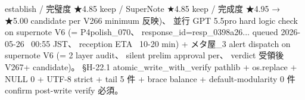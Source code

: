 establish / 完璧度 ★4.85 keep / SuperNote ★4.85 keep / 完成度 ★4.95 → ★5.00 candidate per V266 minimum 反映)、 並行 GPT 5.5pro hard logic check on supernote V6 (= P4polish_070、 response_id=resp_0398a26... queued 2026-05-26 ~00:55 JST、 reception ETA ~10-20 min) + メタ屋_3 alert dispatch on supernote V6 (= 2 layer audit、 silent prelim approval per、 verdict 受領後 V267+ candidate)。 §H-22.1 atomic_write_with_verify pathlib + os.replace + NULL 0 + UTF-8 strict + tail  5 件 + brace balance + default-modularity 0 件 confirm post-write verify 必須。
